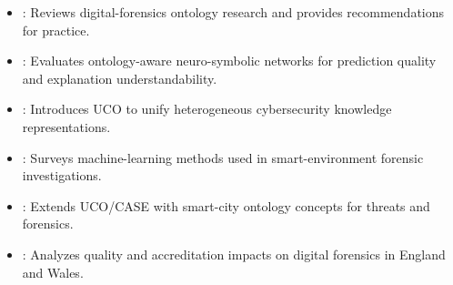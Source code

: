 \documentclass[11pt]{article}
\begin{document}
\begin{itemize}
  \item \textcite{silva2024ontologiesdf}: Reviews digital-forensics ontology research and provides recommendations for practice.
  \item \textcite{smirnov2024ontologyneurosymbolic}: Evaluates ontology-aware neuro-symbolic networks for prediction quality and explanation understandability.
  \item \textcite{syed2016uco}: Introduces UCO to unify heterogeneous cybersecurity knowledge representations.
  \item \textcite{tageldin2023mlforensics}: Surveys machine-learning methods used in smart-environment forensic investigations.
  \item \textcite{tok2025scopeontology}: Extends UCO/CASE with smart-city ontology concepts for threats and forensics.
  \item \textcite{tully2020qualitydf}: Analyzes quality and accreditation impacts on digital forensics in England and Wales.
\end{itemize}

\printbibliography[title={References with Annotations}]
\end{document}
